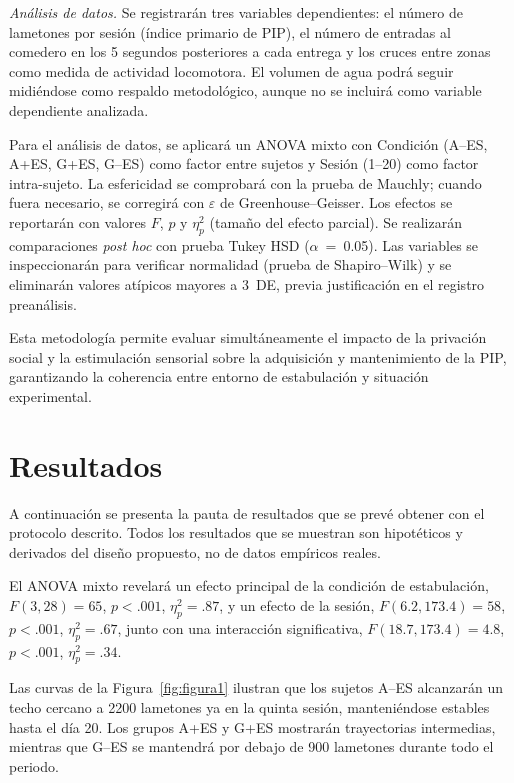 \documentclass[12pt,a4paper]{article}
\begin{document}
\begin{multicols}{2}
\textit{Análisis de datos.} Se registrarán tres variables dependientes: el número de lametones por sesión (índice primario de PIP), el número de entradas al comedero en los 5 segundos posteriores a cada entrega y los cruces entre zonas como medida de actividad locomotora. El volumen de agua podrá seguir midiéndose como respaldo metodológico, aunque no se incluirá como variable dependiente analizada.

Para el análisis de datos, se aplicará un ANOVA mixto con Condición (A--ES, A+ES, G+ES, G--ES) como factor entre sujetos y Sesión (1–20) como factor intra-sujeto. La esfericidad se comprobará con la prueba de Mauchly; cuando fuera necesario, se corregirá con $\varepsilon$ de Greenhouse–Geisser. Los efectos se reportarán con valores $F$, $p$ y $\eta^2_p$ (tamaño del efecto parcial). Se realizarán comparaciones \textit{post hoc} con prueba Tukey HSD ($\alpha$~=~0.05). Las variables se inspeccionarán para verificar normalidad (prueba de Shapiro–Wilk) y se eliminarán valores atípicos mayores a $3$~DE, previa justificación en el registro preanálisis.


\vspace{2mm}
Esta metodología permite evaluar simultáneamente el impacto de la privación social y la estimulación sensorial sobre la adquisición y mantenimiento de la PIP, garantizando la coherencia entre entorno de estabulación y situación experimental.


\section{Resultados}

A continuación se presenta la pauta de resultados que se prevé obtener con el protocolo descrito. Todos los resultados que se muestran son hipotéticos y derivados del diseño propuesto, no de datos empíricos reales. 

El ANOVA mixto revelará un efecto principal de la condición de estabulación, $F(3, 28) = 65$, $p < .001$, $\eta^2_p = .87$, y un efecto de la sesión, $F(6.2, 173.4) = 58$, $p < .001$, $\eta^2_p = .67$, junto con una interacción significativa, $F(18.7, 173.4) = 4.8$, $p < .001$, $\eta^2_p = .34$.

Las curvas de la Figura~\ref{fig:figura1} ilustran que los sujetos A--ES alcanzarán un techo cercano a 2200 lametones ya en la quinta sesión, manteniéndose estables hasta el día 20. Los grupos A+ES y G+ES mostrarán trayectorias intermedias, mientras que G--ES se mantendrá por debajo de 900 lametones durante todo el periodo.


\end{multicols}
\end{document}
